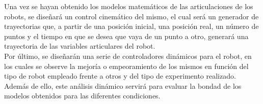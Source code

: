 \documentclass[a4paper,twoside]{article}
\begin{document}
Una vez se hayan obtenido los modelos matemáticos de las articulaciones de los robots, se diseñará un control cinemático del mismo, el cual será un generador de trayectorias que, a partir de una posición inicial, una posición real, un número de puntos y el tiempo en que se desea que vaya de un punto a otro, generará una trayectoria de las variables articulares del robot.\\

Por último, se diseñarán una serie de controladores dinámicos para el robot, en los cuales se observe la mejoría o empeoramiento de los mismos en función del tipo de robot empleado frente a otros y del tipo de experimento realizado.\\
Además de ello, este análisis dinámico servirá para evaluar la bondad de los modelos obtenidos para las diferentes condiciones.

\newpage

\newpage

\newpage

\newpage
%
\newpage

\newpage

\end{document}
